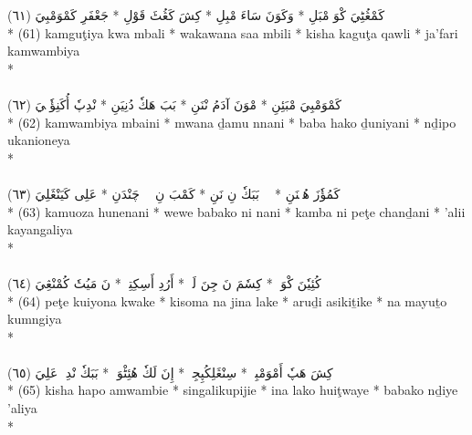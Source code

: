 \documentclass[a4paper, 12pt]{report}
\begin{document}
\begin{center}
\textarabic{(٦١) \textcolor{mygreen}{كَمْڠُٹِيَ كْوَ مْبَلِ  * وَكَوَنَ سَاءَ مْبِلِ  * كِشَ كَڠُٹَ قَوْلِ  * جَعْفَرِ كَمْوَمْبِيَ }} \\* 
(61) kamguţiya kwa mbali  * wakawana saa mbili  * kisha kaguţa qawli  * ja'fari kamwambiya  \\* 
 \\ 
\\[8mm] 

\textarabic{(٦٢) \textcolor{mygreen}{كَمْوَمْبِيَ مْبَئِنِ  * مْوَنَ آدَمُ نْنَنِ  * بَبَ هَكٗ دُنِيَنِ  * نْدِپٗ أُكَنِؤٗنٖيَ }} \\* 
(62) kamwambiya mbaini  * mwana ḏamu nnani  * baba hako ḏuniyani  * nḏipo ukanioneya  \\* 
 \\ 
\\[8mm] 

\textarabic{(٦٣) \textcolor{mygreen}{كَمُؤٗزَ هُنٖنَنِ  * وٖوٖ بَبَكٗ نِ نَنِ  * كَمْبَ نِ پٖٹٖ چَنْدَنِ  * عَلِى كَيَنْڠَلِيَ }} \\* 
(63) kamuoza hunenani  * wewe babako ni nani  * kamba ni peţe chanḏani  * 'alii kayangaliya  \\* 
 \\ 
\\[8mm] 

\textarabic{(٦٤) \textcolor{mygreen}{پٖٹٖ كُئِيٗنَ كْوَكٖ  * كِسٗمَ نَ جِنَ لَكٖ  * أَرُدِ أَسِكِتِكٖ  * نَ مَيُتٗ كُمْنْڠِيَ }} \\* 
(64) peţe kuiyona kwake  * kisoma na jina lake  * aruḏi asikiṯike  * na mayuṯo kumngiya  \\* 
 \\ 
\\[8mm] 

\textarabic{(٦٥) \textcolor{mygreen}{كِشَ هَپٗ أَمْوَمْبِئٖ  * سِنْڠَلِكُپِجِئٖ  * إِنَ لَكٗ هُئِٹْوَيٖ  * بَبَكٗ نْدِيٖ عَلِيَ }} \\* 
(65) kisha hapo amwambie  * singalikupijie  * ina lako huiţwaye  * babako nḏiye 'aliya  \\* 
 \\ 
\\[8mm] 


\end{center}
\end{document}
